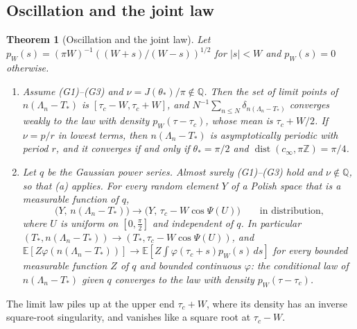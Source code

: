 \documentclass[11pt]{amsart}
\newtheorem{theorem}{Theorem}[section]
\theoremstyle{definition}
\theoremstyle{remark}
\numberwithin{equation}{section}
\newcommand{\Q}{\mathbb{Q}}
\newcommand{\Z}{\mathbb{Z}}
\newcommand{\E}{\mathbb{E}}
\DeclareMathOperator{\dist}{dist}
\begin{document}
\subsection{Oscillation and the joint law}\label{sec:jointlaw}

\begin{theorem}[Oscillation and the joint law]\label{thm:jointlaw}
Let $p_W(s)=(\pi W)^{-1}((W+s)/(W-s))^{1/2}$ for $|s|<W$ and $p_W(s)=0$ otherwise.
\begin{enumerate}
\item[(a)] Assume (G1)--(G3) and $\nu=J(\theta_*)/\pi\notin\Q$. Then the set of limit points of $n(\Lambda_n-T_*)$ is
$[\tau_c-W,\tau_c+W]$, and $N^{-1}\sum_{n\le N}\delta_{n(\Lambda_n-T_*)}$ converges weakly to the law with density
$p_W(\tau-\tau_c)$, whose mean is $\tau_c+W/2$. If $\nu=p/r$ in lowest terms, then $n(\Lambda_n-T_*)$ is asymptotically
periodic with period $r$, and it converges if and only if $\theta_*=\pi/2$ and $\dist(c_\infty,\pi\Z)=\pi/4$.
\item[(b)] Let $q$ be the Gaussian power series. Almost surely (G1)--(G3) hold and $\nu\notin\Q$, so that (a) applies.
For every random element $Y$ of a Polish space that is a measurable function of $q$,
\[
\bigl(Y,\,n(\Lambda_n-T_*)\bigr)\longrightarrow\bigl(Y,\,\tau_c-W\cos\Psi(U)\bigr)\qquad\text{in distribution,}
\]
where $U$ is uniform on $[0,\frac\pi2]$ and independent of $q$. In particular
$(T_*,n(\Lambda_n-T_*))\to(T_*,\tau_c-W\cos\Psi(U))$, and $\E[Z\varphi(n(\Lambda_n-T_*))]\to\E[Z\int\varphi(\tau_c+s)p_W(s)\,ds]$
for every bounded measurable function $Z$ of $q$ and bounded continuous $\varphi$: the conditional law of
$n(\Lambda_n-T_*)$ given $q$ converges to the law with density $p_W(\tau-\tau_c)$.
\end{enumerate}
\end{theorem}

The limit law piles up at the upper end $\tau_c+W$, where its density has an inverse square-root singularity, and
vanishes like a square root at $\tau_c-W$.
\end{document}
